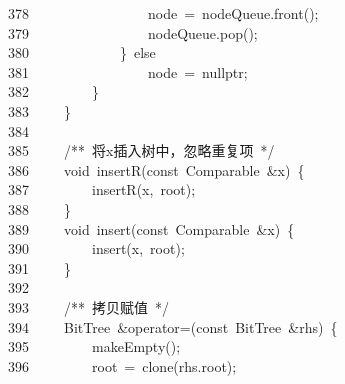 \documentclass[11pt,a4paper]{ctexart}
\newcommand{\hlstd}[1]{\textcolor[rgb]{0.2,0.2,0.2}{#1}}
\newcommand{\hlcom}[1]{\textcolor[rgb]{0.59,0.59,0.59}{#1}}
\newcommand{\hlopt}[1]{\textcolor[rgb]{0.2,0.2,0.2}{#1}}
\newcommand{\hllin}[1]{\textcolor[rgb]{0.59,0.59,0.59}{#1}}
\newcommand{\hlkwa}[1]{\textcolor[rgb]{0.23,0.42,0.78}{#1}}
\newcommand{\hlkwb}[1]{\textcolor[rgb]{0.63,0,0.31}{#1}}
\newcommand{\hlkwc}[1]{\textcolor[rgb]{0,0.63,0.31}{#1}}
\newcommand{\hlkwd}[1]{\textcolor[rgb]{0.78,0.23,0.41}{#1}}
\begin{document}
\hllin{378\ }\hlstd{}\hlstd{\ \ \ \ \ \ \ \ \ \ \ \ \ \ \ \ }\hlstd{node\ }\hlopt{=\ }\hlstd{nodeQueue}\hlopt{.}\hlstd{}\hlkwd{front}\hlstd{}\hlopt{();}\\
\hllin{379\ }\hlstd{}\hlstd{\ \ \ \ \ \ \ \ \ \ \ \ \ \ \ \ }\hlstd{nodeQueue}\hlopt{.}\hlstd{}\hlkwd{pop}\hlstd{}\hlopt{();}\\
\hllin{380\ }\hlstd{}\hlstd{\ \ \ \ \ \ \ \ \ \ \ \ }\hlstd{}\hlopt{\}\ }\hlstd{}\hlkwa{else}\\
\hllin{381\ }\hlstd{}\hlstd{\ \ \ \ \ \ \ \ \ \ \ \ \ \ \ \ }\hlstd{node\ }\hlopt{=\ }\hlstd{}\hlkwc{nullptr}\hlstd{}\hlopt{;}\\
\hllin{382\ }\hlstd{}\hlstd{\ \ \ \ \ \ \ \ }\hlstd{}\hlopt{\}}\\
\hllin{383\ }\hlstd{}\hlstd{\ \ \ \ }\hlstd{}\hlopt{\}}\\
\hllin{384\ }\hlstd{}\\
\hllin{385\ }\hlstd{}\hlstd{\ \ \ \ }\hlstd{}\hlcom{/{*}{*}\ 将x插入树中，忽略重复项\ {*}/}\hlstd{}\\
\hllin{386\ }\hlstd{}\hlstd{\ \ \ \ }\hlstd{}\hlkwb{void\ }\hlstd{}\hlkwd{insertR}\hlstd{}\hlopt{(}\hlstd{}\hlkwb{const\ }\hlstd{Comparable\ }\hlopt{\&}\hlstd{x}\hlopt{)\ \{}\\
\hllin{387\ }\hlstd{}\hlstd{\ \ \ \ \ \ \ \ }\hlstd{}\hlkwd{insertR}\hlstd{}\hlopt{(}\hlstd{x}\hlopt{,\ }\hlstd{root}\hlopt{);}\\
\hllin{388\ }\hlstd{}\hlstd{\ \ \ \ }\hlstd{}\hlopt{\}}\\
\hllin{389\ }\hlstd{}\hlstd{\ \ \ \ }\hlstd{}\hlkwb{void\ }\hlstd{}\hlkwd{insert}\hlstd{}\hlopt{(}\hlstd{}\hlkwb{const\ }\hlstd{Comparable\ }\hlopt{\&}\hlstd{x}\hlopt{)\ \{}\\
\hllin{390\ }\hlstd{}\hlstd{\ \ \ \ \ \ \ \ }\hlstd{}\hlkwd{insert}\hlstd{}\hlopt{(}\hlstd{x}\hlopt{,\ }\hlstd{root}\hlopt{);}\\
\hllin{391\ }\hlstd{}\hlstd{\ \ \ \ }\hlstd{}\hlopt{\}}\\
\hllin{392\ }\hlstd{}\\
\hllin{393\ }\hlstd{}\hlstd{\ \ \ \ }\hlstd{}\hlcom{/{*}{*}\ 拷贝赋值\ {*}/}\hlstd{}\\
\hllin{394\ }\hlstd{}\hlstd{\ \ \ \ }\hlstd{BitTree\ }\hlopt{\&}\hlstd{}\hlkwc{operator}\hlstd{}\hlopt{=(}\hlstd{}\hlkwb{const\ }\hlstd{BitTree\ }\hlopt{\&}\hlstd{rhs}\hlopt{)\ \{}\\
\hllin{395\ }\hlstd{}\hlstd{\ \ \ \ \ \ \ \ }\hlstd{}\hlkwd{makeEmpty}\hlstd{}\hlopt{();}\\
\hllin{396\ }\hlstd{}\hlstd{\ \ \ \ \ \ \ \ }\hlstd{root\ }\hlopt{=\ }\hlstd{}\hlkwd{clone}\hlstd{}\hlopt{(}\hlstd{rhs}\hlopt{.}\hlstd{root}\hlopt{);}\\
\end{document}
